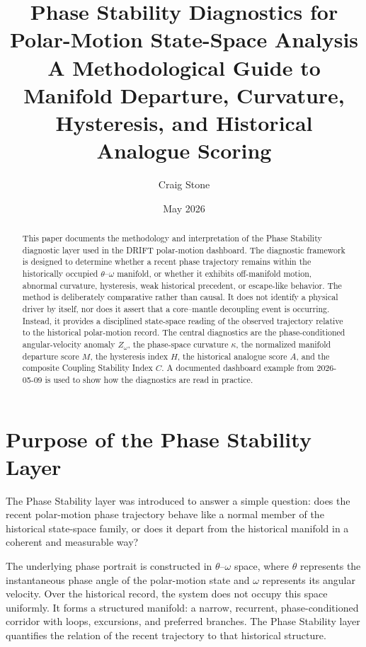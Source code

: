 \documentclass[11pt]{article}
\title{\textbf{Phase Stability Diagnostics for Polar-Motion State-Space Analysis}\\\large A Methodological Guide to Manifold Departure, Curvature, Hysteresis, and Historical Analogue Scoring}
\author{Craig Stone}
\date{May 2026}
\begin{document}
\maketitle

\begin{abstract}
This paper documents the methodology and interpretation of the Phase Stability diagnostic layer used in the DRIFT polar-motion dashboard. The diagnostic framework is designed to determine whether a recent phase trajectory remains within the historically occupied \(\theta\)--\(\omega\) manifold, or whether it exhibits off-manifold motion, abnormal curvature, hysteresis, weak historical precedent, or escape-like behavior. The method is deliberately comparative rather than causal. It does not identify a physical driver by itself, nor does it assert that a core--mantle decoupling event is occurring. Instead, it provides a disciplined state-space reading of the observed trajectory relative to the historical polar-motion record. The central diagnostics are the phase-conditioned angular-velocity anomaly \(Z_{\omega}\), the phase-space curvature \(\kappa\), the normalized manifold departure score \(M\), the hysteresis index \(H\), the historical analogue score \(A\), and the composite Coupling Stability Index \(C\). A documented dashboard example from 2026-05-09 is used to show how the diagnostics are read in practice.
\end{abstract}

\section{Purpose of the Phase Stability Layer}

The Phase Stability layer was introduced to answer a simple question: does the recent polar-motion phase trajectory behave like a normal member of the historical state-space family, or does it depart from the historical manifold in a coherent and measurable way?

The underlying phase portrait is constructed in \(\theta\)--\(\omega\) space, where \(\theta\) represents the instantaneous phase angle of the polar-motion state and \(\omega\) represents its angular velocity. Over the historical record, the system does not occupy this space uniformly. It forms a structured manifold: a narrow, recurrent, phase-conditioned corridor with loops, excursions, and preferred branches. The Phase Stability layer quantifies the relation of the recent trajectory to that historical structure.
\end{document}
